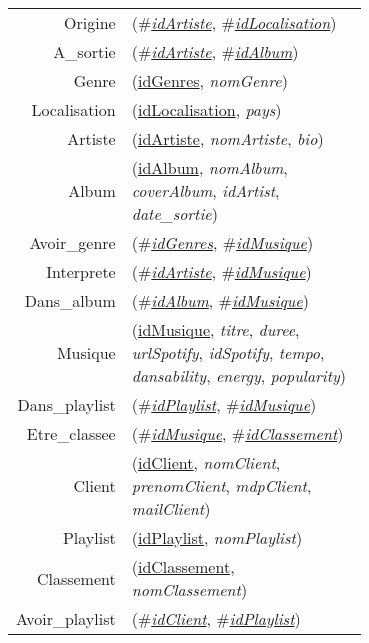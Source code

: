 
\usepackage[normalem]{ulem}
\newenvironment{mld}
  {\par\begin{minipage}{\linewidth}\begin{tabular}{rp{0.7\linewidth}}}
  {\end{tabular}\end{minipage}\par}
\newcommand{\relat}[1]{\textsc{#1}}
\newcommand{\attr}[1]{\emph{#1}}
\newcommand{\prim}[1]{\uline{#1}}
\newcommand{\foreign}[1]{\#\textsl{#1}}


\begin{mld}
  Origine & (\foreign{\prim{idArtiste}}, \foreign{\prim{idLocalisation}})\\
  A\_sortie & (\foreign{\prim{idArtiste}}, \foreign{\prim{idAlbum}})\\
  Genre & (\prim{idGenres}, \attr{nomGenre})\\
  Localisation & (\prim{idLocalisation}, \attr{pays})\\
  Artiste & (\prim{idArtiste}, \attr{nomArtiste}, \attr{bio})\\
  Album & (\prim{idAlbum}, \attr{nomAlbum}, \attr{coverAlbum}, \attr{idArtist}, \attr{date\_sortie})\\
  Avoir\_genre & (\foreign{\prim{idGenres}}, \foreign{\prim{idMusique}})\\
  Interprete & (\foreign{\prim{idArtiste}}, \foreign{\prim{idMusique}})\\
  Dans\_album & (\foreign{\prim{idAlbum}}, \foreign{\prim{idMusique}})\\
  Musique & (\prim{idMusique}, \attr{titre}, \attr{duree}, \attr{urlSpotify}, \attr{idSpotify}, \attr{tempo}, \attr{dansability}, \attr{energy}, \attr{popularity})\\
  Dans\_playlist & (\foreign{\prim{idPlaylist}}, \foreign{\prim{idMusique}})\\
  Etre\_classee & (\foreign{\prim{idMusique}}, \foreign{\prim{idClassement}})\\
  Client & (\prim{idClient}, \attr{nomClient}, \attr{prenomClient}, \attr{mdpClient}, \attr{mailClient})\\
  Playlist & (\prim{idPlaylist}, \attr{nomPlaylist})\\
  Classement & (\prim{idClassement}, \attr{nomClassement})\\
  Avoir\_playlist & (\foreign{\prim{idClient}}, \foreign{\prim{idPlaylist}})\\
\end{mld}
